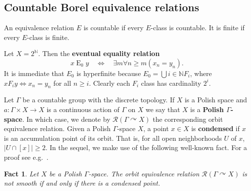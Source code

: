 \documentclass{amsart}
\newcommand{\markdef}[1]{\textbf{#1}}
\newtheorem{proposition}[theorem]{Proposition}
\newtheorem{fact}[theorem]{Fact}
\theoremstyle{definition}
\theoremstyle{remark}
\begin{document}
\subsection{Countable Borel equivalence relations}



An equivalence relation \(E\) is countable if every \(E\)-class is countable. It is finite if every \(E\)-class is finite.

Let \(X = 2^\mathbb{N}\). Then the \markdef{eventual equality relation}
\[
x\mathbin{E}_0y\quad \iff\quad \exists m \forall n \geq m(x_n = y_n).
\]
It is immediate that \(E_0\) is hyperfinite because \(E_0 = \bigcup{i\in\mathbb{N}} F_i\), where \(x\mathbin{F_i} y \iff x_n= y_n\) for all \(n\geq i\). Clearly each \(F_i\) class has cardinality \(2^i\).

Let \(\Gamma\) be a countable group with the discrete topology.
If \(X\) is a Polish space and \(a\colon \Gamma\times X \to X\) is a continuous action of \(\Gamma\) on \(X\) we say that \(X\) is a \markdef{Polish \(\Gamma\)-space}. In which case, we denote by \(\mathcal{R}(\Gamma\curvearrowright X)\) the corresponding orbit equivalence relation.
Given a Polish \(\Gamma\)-space $X$, a point $x\in X$ is \markdef{condensed} if \(x\) is an accumulation point of its orbit. That is,  for all open neighborhoods $U$ of $x$, $|U\cap[x]|\geq 2$. In the sequel, we make use of the following well-known fact. For a proof see e.g.~\cite[Proposition~2.2]{CalCla23'}.

\begin{fact}
Let \(X\) be a Polish \(\Gamma\)-space.  The orbit equivalence relation \(\mathcal{R}(\Gamma\curvearrowright X)\) is not smooth if and only if there is a condensed point.
\end{fact}
\end{document}
